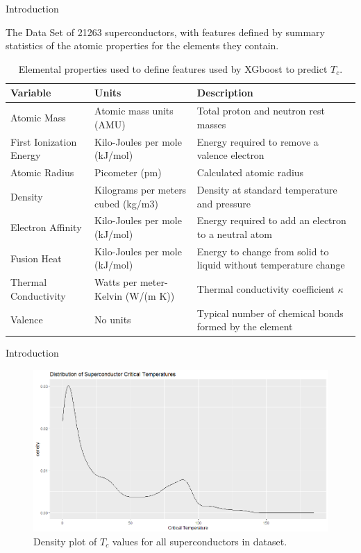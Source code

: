 \documentclass{beamer}
\begin{document}
  \begin{frame}{Introduction}
  \begin{block}{The Data}
    Set of 21263 superconductors, with features defined by summary statistics of the atomic properties for the elements they contain.
  \end{block}
  \begin{table}[h]
     \centering
     \tiny
     \begin{tabularx}{\linewidth}{X X X}
          \hline
          Variable & Units & Description\\
          \hline
        Atomic Mass &Atomic mass units (AMU) &Total proton and neutron rest masses\\
        First Ionization Energy &Kilo-Joules per mole (kJ/mol)&Energy required to remove a valence electron\\
        Atomic Radius & Picometer (pm) &Calculated atomic radius\\
        Density&Kilograms per meters cubed (kg/m3)&Density at standard temperature and pressure\\
        Electron Affinity &Kilo-Joules per mole (kJ/mol) &Energy required to add an electron to a neutral atom\\
        Fusion Heat &Kilo-Joules per mole (kJ/mol) &Energy to change from solid to liquid without temperature change\\
        Thermal Conductivity &Watts per meter-Kelvin (W/(m K)) &Thermal conductivity coefficient $\kappa$\\
        Valence &No units &Typical number of chemical bonds formed by the element\\
        \hline
     \end{tabularx}
     \caption{Elemental properties used to define features used by XGboost to predict $T_c$. }
     \label{tab:elemental_properties}
 \end{table}
  \end{frame}
  
  \begin{frame}{Introduction}
       \begin{figure}
     \centering
     \includegraphics[width=\linewidth]{Tc_dist.png}
     \caption{Density plot of $T_c$ values for all superconductors in dataset.}
     \label{fig:Tc_density}
 \end{figure}
  \end{frame}
  
\end{document}
